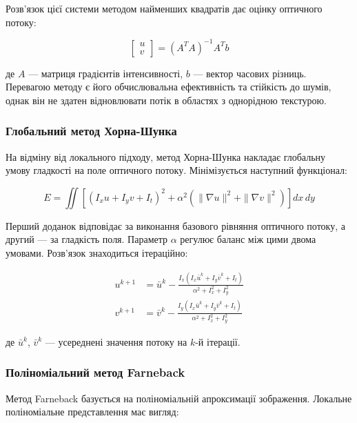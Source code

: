 \documentclass[14pt, a4paper]{extarticle}
\numberwithin{equation}{section}
\begin{document}
Розв'язок цієї системи методом найменших квадратів дає оцінку оптичного потоку:

\begin{equation}
\begin{bmatrix} u \\ v \end{bmatrix} = (A^T A)^{-1} A^T b \tag{10}
\end{equation}

де $A$ — матриця градієнтів інтенсивності, $b$ — вектор часових різниць. Перевагою методу є його обчислювальна ефективність та стійкість до шумів, однак він не здатен відновлювати потік в областях з однорідною текстурою.

\subsubsection{Глобальний метод Хорна-Шунка}

На відміну від локального підходу, метод Хорна-Шунка \cite{horn1981determining} накладає глобальну умову гладкості на поле оптичного потоку. Мінімізується наступний функціонал:

\begin{equation}
E = \iint \left[(I_x u + I_y v + I_t)^2 + \alpha^2 \left( \|\nabla u\|^2 + \|\nabla v\|^2 \right) \right] dx\,dy \tag{11}
\end{equation}

Перший доданок відповідає за виконання базового рівняння оптичного потоку, а другий — за гладкість поля. Параметр $\alpha$ регулює баланс між цими двома умовами. Розв'язок знаходиться ітераційно:

\begin{align}
u^{k+1} &= \bar{u}^k - \frac{I_x (I_x \bar{u}^k + I_y \bar{v}^k + I_t)}{\alpha^2 + I_x^2 + I_y^2} \tag{14} \\
v^{k+1} &= \bar{v}^k - \frac{I_y (I_x \bar{u}^k + I_y \bar{v}^k + I_t)}{\alpha^2 + I_x^2 + I_y^2} \tag{15}
\end{align}

де $\bar{u}^k$, $\bar{v}^k$ — усереднені значення потоку на $k$-й ітерації.

\subsubsection{Поліноміальний метод Farneback}

Метод Farneback \cite{farneback2003two} базується на поліноміальній апроксимації зображення. Локальне поліноміальне представлення має вигляд:
\end{document}
